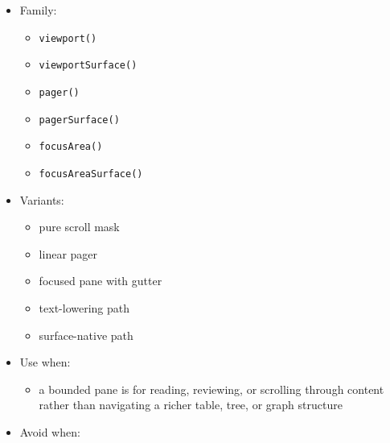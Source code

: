 \begin{itemize}
\tightlist
\item
  Family:

  \begin{itemize}
  \tightlist
  \item
    \texttt{v\allowbreak{}i\allowbreak{}e\allowbreak{}w\allowbreak{}p\allowbreak{}o\allowbreak{}r\allowbreak{}t\allowbreak{}(\allowbreak{})}
  \item
    \texttt{v\allowbreak{}i\allowbreak{}e\allowbreak{}w\allowbreak{}p\allowbreak{}o\allowbreak{}r\allowbreak{}t\allowbreak{}S\allowbreak{}u\allowbreak{}r\allowbreak{}f\allowbreak{}a\allowbreak{}c\allowbreak{}e\allowbreak{}(\allowbreak{})}
  \item
    \texttt{p\allowbreak{}a\allowbreak{}g\allowbreak{}e\allowbreak{}r\allowbreak{}(\allowbreak{})}
  \item
    \texttt{p\allowbreak{}a\allowbreak{}g\allowbreak{}e\allowbreak{}r\allowbreak{}S\allowbreak{}u\allowbreak{}r\allowbreak{}f\allowbreak{}a\allowbreak{}c\allowbreak{}e\allowbreak{}(\allowbreak{})}
  \item
    \texttt{f\allowbreak{}o\allowbreak{}c\allowbreak{}u\allowbreak{}s\allowbreak{}A\allowbreak{}r\allowbreak{}e\allowbreak{}a\allowbreak{}(\allowbreak{})}
  \item
    \texttt{f\allowbreak{}o\allowbreak{}c\allowbreak{}u\allowbreak{}s\allowbreak{}A\allowbreak{}r\allowbreak{}e\allowbreak{}a\allowbreak{}S\allowbreak{}u\allowbreak{}r\allowbreak{}f\allowbreak{}a\allowbreak{}c\allowbreak{}e\allowbreak{}(\allowbreak{})}
  \end{itemize}
\item
  Variants:

  \begin{itemize}
  \tightlist
  \item
    pure scroll mask
  \item
    linear pager
  \item
    focused pane with gutter
  \item
    text-lowering path
  \item
    surface-native path
  \end{itemize}
\item
  Use when:

  \begin{itemize}
  \tightlist
  \item
    a bounded pane is for reading, reviewing, or scrolling through content rather than navigating a richer table, tree, or graph structure
  \end{itemize}
\item
  Avoid when:


\end{itemize}
